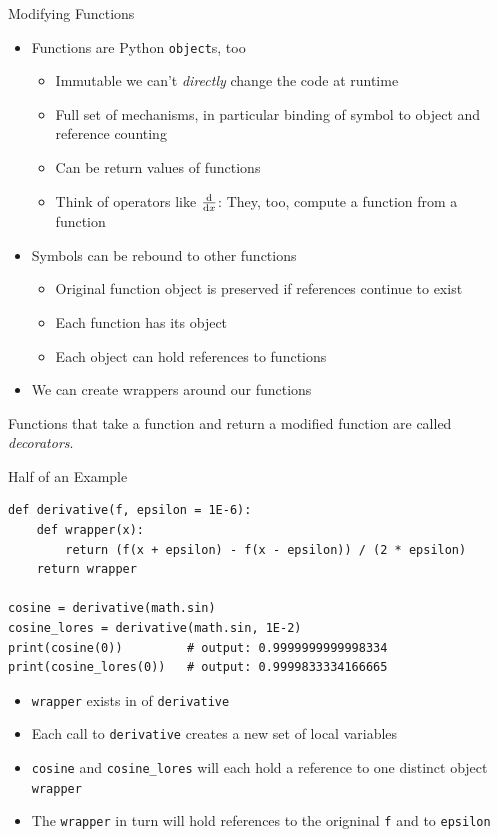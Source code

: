 \begin{frame}{Modifying Functions}
%
\begin{itemize}
\item Functions are Python \texttt{object}s, too
	\begin{itemize}
	\item Immutable \Thus we can't \emph{directly} change the code at runtime
	\item Full set of mechanisms, in particular binding of symbol to object and reference counting
	\item Can be return values of functions
	\item Think of operators like $\dv{x}$: They, too, compute a function from a function
	\end{itemize}
\item Symbols can be rebound to other functions
	\begin{itemize}
	\item Original function object is preserved if references continue to exist
	\item Each function has its  object
	\item Each  object can hold references to functions
	\end{itemize}
\item[\Thus] We can create wrappers around our functions
\end{itemize}
%
\begin{hintbox}[Nomenclature]
Functions that take a function and return a modified function are called \emph{decorators}.
\end{hintbox}
%
\end{frame}


\begin{frame}[fragile]{Half of an Example}
%
\begin{codebox}
\begin{verbatim}
def derivative(f, epsilon = 1E-6):
    def wrapper(x):
        return (f(x + epsilon) - f(x - epsilon)) / (2 * epsilon)
    return wrapper

cosine = derivative(math.sin)
cosine_lores = derivative(math.sin, 1E-2)
print(cosine(0))         # output: 0.9999999999998334
print(cosine_lores(0))   # output: 0.9999833334166665
\end{verbatim}
\end{codebox}
%
\begin{itemize}
\item \texttt{wrapper} exists in  of \texttt{derivative}
\item Each call to \texttt{derivative} creates a new set of local variables
\item \texttt{cosine} and \texttt{cosine\_lores} will each hold a reference to one distinct object \texttt{wrapper}
\item The \texttt{wrapper} in turn will hold references to the origninal \texttt{f} and to \texttt{epsilon}
\end{itemize}
%
\end{frame}

